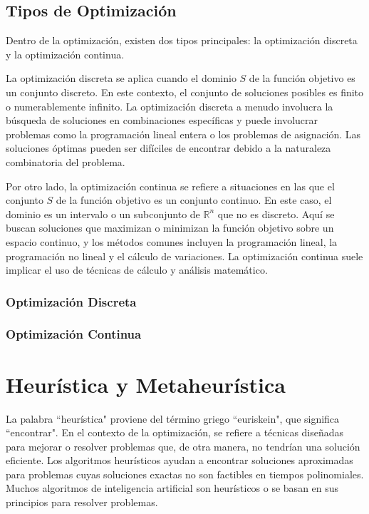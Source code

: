 \documentclass[12pt,titlepage,twoside,openright]{book}
\begin{document}
\subsection{Tipos de Optimización}

Dentro de la optimizaci\'on, existen dos tipos principales: la optimizaci\'on discreta y la optimizaci\'on continua.

La optimizaci\'on discreta se aplica cuando el dominio \( S \) de la funci\'on objetivo es un conjunto discreto. En este contexto, el conjunto de soluciones posibles es finito o numerablemente infinito. La optimizaci\'on discreta a menudo involucra la b\'usqueda de soluciones en combinaciones espec\'ificas y puede involucrar problemas como la programaci\'on lineal entera o los problemas de asignaci\'on. Las soluciones \'optimas pueden ser dif\'iciles de encontrar debido a la naturaleza combinatoria del problema.

Por otro lado, la optimizaci\'on continua se refiere a situaciones en las que el conjunto \( S \) de la funci\'on objetivo es un conjunto continuo. En este caso, el dominio es un intervalo o un subconjunto de \( \mathbb{R}^n \) que no es discreto. Aqu\'i se buscan soluciones que maximizan o minimizan la funci\'on objetivo sobre un espacio continuo, y los m\'etodos comunes incluyen la programaci\'on lineal, la programaci\'on no lineal y el c\'alculo de variaciones. La optimizaci\'on continua suele implicar el uso de t\'ecnicas de c\'alculo y an\'alisis matem\'atico.

\subsubsection{Optimizaci\'on Discreta}
\subsubsection{Optimizaci\'on Continua}

\section{Heur\'istica y Metaheur\'istica}

La palabra ``heur\'istica" proviene del t\'ermino griego ``euriskein", que significa ``encontrar".
En el contexto de la optimizaci\'on, se refiere a t\'ecnicas dise\~nadas para mejorar o resolver problemas que, de otra manera, no tendr\'ian una soluci\'on eficiente. Los algoritmos heur\'isticos ayudan a encontrar soluciones aproximadas para problemas cuyas soluciones exactas no son factibles en tiempos polinomiales.
Muchos algoritmos de inteligencia artificial son heur\'isticos o se basan en sus principios para resolver problemas.
\end{document}
